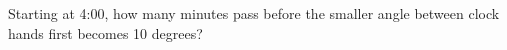 Starting at 4:00, how many minutes pass before the smaller angle between clock hands first becomes 10 degrees?
